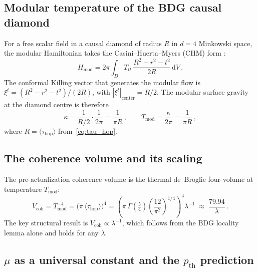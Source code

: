 \documentclass[11pt,a4paper]{article}
\theoremstyle{plain}
\theoremstyle{definition}
\theoremstyle{remark}
\begin{document}
\subsection{Modular temperature of the BDG causal diamond}

For a free scalar field in a causal diamond of radius $R$ in $d=4$
Minkowski space, the modular Hamiltonian takes the
Casini--Huerta--Myers (CHM) form \cite{Casini2011}:
\begin{equation}
  H_{\mathrm{mod}} = 2\pi \int_D T_{tt}\,
    \frac{R^2 - r^2 - t^2}{2R}\,\mathrm{d}V \,.
\end{equation}
The conformal Killing vector that generates the modular flow is
$\xi^t = (R^2 - r^2 - t^2)/(2R)$, with $|\xi^t|_{\mathrm{center}} = R/2$.
The modular surface gravity at the diamond centre is therefore
\begin{equation}
  \kappa = \frac{1}{R/2}\cdot\frac{1}{2\pi} = \frac{1}{\pi R}\,,
  \qquad
  T_{\mathrm{mod}} = \frac{\kappa}{2\pi} = \frac{1}{\pi R}\,,
\end{equation}
where $R = \langle\tau_{\mathrm{hop}}\rangle$ from~\eqref{eq:tau_hop}.

\subsection{The coherence volume and its scaling}

The pre-actualization coherence volume is the thermal de~Broglie
four-volume at temperature $T_{\mathrm{mod}}$:
\begin{equation}
  V_{\mathrm{coh}}
    = T_{\mathrm{mod}}^{-4}
    = \bigl(\pi\,\langle\tau_{\mathrm{hop}}\rangle\bigr)^4
    = \left(\pi\,\Gamma\!\left(\tfrac{5}{4}\right)
        \left(\frac{12}{\pi^2}\right)^{\!1/4}\right)^{\!4}
      \lambda^{-1}
    \;\approx\; \frac{79.94}{\lambda} \,.
  \label{eq:Vcoh}
\end{equation}
The key structural result is $V_{\mathrm{coh}} \propto \lambda^{-1}$, which
follows from the BDG locality lemma alone and holds for any $\lambda$.

\subsection{$\mu$ as a universal constant and the $p_{\mathrm{th}}$ prediction}
\label{sec:mu_universal}
\end{document}
